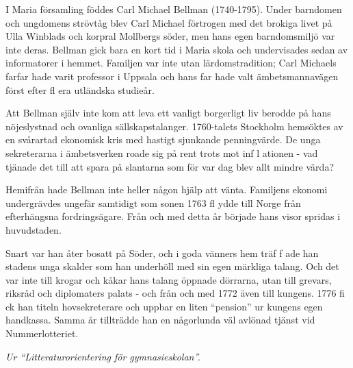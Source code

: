 \vspace{10pt}
{\hspace{10pt} I Maria församling föddes Carl Michael
Bellman (1740-1795).  Under barndomen och ungdomens strövtåg blev Carl
Michael förtrogen med det brokiga livet på Ulla Winblads och korpral
Mollbergs söder, men hans egen barndomsmiljö var inte deras.  Bellman
gick bara en kort tid i Maria skola och undervisades sedan av
informatorer i hemmet. Familjen var inte utan lärdomstradition; Carl
Michaels farfar hade varit professor i Uppsala och hans far hade valt
ämbetsmannavägen först efter fl era utländska studieår.\par
\hspace{10pt} Att Bellman själv inte kom att leva ett vanligt borgerligt liv 
berodde på hans nöjeslystnad och ovanliga sällskapstalanger.
1760-talets Stockholm hemsöktes av en svårartad ekonomisk kris med
hastigt sjunkande penningvärde. De unga sekreterarna i ämbetsverken
roade sig på rent trots mot inf l ationen - vad tjänade det till att
spara på slantarna som för var dag blev allt mindre värda?\par
\hspace{10pt} Hemifrån hade Bellman inte heller någon hjälp att vänta. 
Familjens ekonomi undergrävdes ungefär samtidigt som sonen 1763 fl
ydde till Norge från efterhängsna fordringsägare. Från och med detta
år började hans visor spridas i huvudstaden.\par
\hspace{10pt} Snart var han åter bosatt på Söder, och i goda vänners hem 
träf f ade han stadens unga skalder som han underhöll med sin egen
märkliga talang. Och det var inte till krogar och kåkar hans talang
öppnade dörrarna, utan till grevars, riksråd och diplomaters palats -
och från och med 1772 även till kungens. 1776 fi ck han titeln
hovsekreterare och uppbar en liten ``pension'' ur kungens egen
handkassa. Samma år tillträdde han en någorlunda väl avlönad tjänst
vid Nummerlotteriet.\par}
\vspace{10pt}
{\footnotesize\textit{Ur ``Litteraturorientering för gymnasieskolan''.}}
